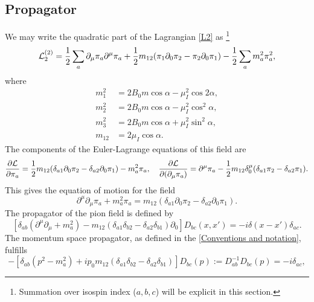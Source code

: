 \subsection{Propagator}
\label{section:propagator}
We may write the quadratic part of the Lagrangian \autoref{L2} as \footnote{Summation over isospin index ($a,b,c$) will be explicit in this section.}
\begin{align}
    \label{quadratic lagrangian}
    \mathcal{L}_2^{(2)}
    =
    \frac{1}{2} \sum_a \partial_\mu \pi_a \partial^\mu \pi_a
    + \frac{1}{2} m_{12} (\pi_1 \partial_0 \pi_2 - \pi_2 \partial_0 \pi_1)
    - \frac{1}{2} \sum_a m_a^2 \pi_a^2,
\end{align}
where
\begin{align}
    m_1^2 &= 2 B_0 m \cos{\alpha} - \mu_I^2 \cos{2\alpha}, \\
    m_2^2 &= 2 B_0 m \cos{\alpha} - \mu_I^2 \cos^2{\alpha}, \\
    m_3^2 &= 2 B_0 m \cos{\alpha} + \mu_I^2 \sin^2{\alpha}, \\
    m_{12} &= 2 \mu_I \cos{\alpha}.
\end{align}
The components of the Euler-Lagrange equations of this field are
\begin{equation*}
    \pdv{\mathcal{L}}{\pi_a} = 
    \frac{1}{2} m_{12} (\delta_{a1} \partial_0 \pi_2 - \delta_{a2}\partial_0 \pi_1) 
    - m^2_{a} \pi_a, \quad
    \pdv{\mathcal{L}}{(\partial_\mu \pi_a)} = 
    \partial^\mu \pi_a - \frac{1}{2} m_{12} \delta^\mu_0 (\delta_{a1}\pi_2  - \delta_{a2}\pi_1).
\end{equation*}
This gives the equation of motion for the field
\begin{equation}
    \partial^\mu \partial_\mu \pi_a + m_a^2 \pi_a
    =  m_{12}(\delta_{a1} \partial_0 \pi_2  - \delta_{a2} \partial_0 \pi_1).
\end{equation}
The propagator of the pion field is defined by
\begin{equation}
    \left[
        \delta_{ab}(\partial^\mu\partial_\mu + m^2_a)
        -  m_{12}(\delta_{a1} \delta_{b2} - \delta_{a2}\delta_{b1}) \partial_0
    \right] 
    D_{bc}(x, x') 
    = -i \delta(x - x') \delta_{ac}.
\end{equation}
The momentum space propagator, as defined in the \autoref{Conventions and notation}, fulfills
\begin{equation*}
    -\left[
        \delta_{ab}(p^2 - m_a^2)
        +  i p_0 m_{12}(\delta_{a1} \delta_{b2} - \delta_{a2}\delta_{b1}) 
    \right] 
     D_{bc}(p) 
    := D^{-1}_{ab}  D_{bc}(p) = -i \delta_{ac},
\end{equation*}
